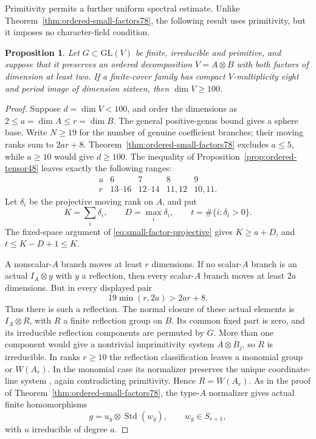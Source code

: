 \documentclass[11pt]{article}
\newtheorem{proposition}[theorem]{Proposition}
\theoremstyle{definition}
\theoremstyle{remark}
\begin{document}
Primitivity permits a further uniform spectral estimate. Unlike
Theorem~\ref{thm:ordered-small-factors78}, the following result
uses primitivity, but it imposes no character-field condition.

\begin{proposition}\label{prop:primitive-ordered100}
Let $G\subset\mathrm{GL}(V)$ be finite, irreducible and primitive,
and suppose that it preserves an ordered decomposition
$V=A\otimes B$ with both factors of dimension at least two.
If a finite-cover family has compact $V$-multiplicity eight
and period image of dimension sixteen, then $\dim V\geq100$.
\end{proposition}

\begin{proof}
Suppose $d=\dim V<100$, and order the dimensions as
$2\leq a=\dim A\leq r=\dim B$. The general positive-genus
bound gives a sphere base. Write $N\geq19$ for the number
of genuine coefficient branches; their moving ranks sum to
$2ar+8$. Theorem~\ref{thm:ordered-small-factors78} excludes
$a\leq5$, while $a\geq10$ would give $d\geq100$.
The inequality of Proposition~\ref{prop:ordered-tensor48}
leaves exactly the following ranges:
\[
\begin{array}{c|cccc}
 a&6&7&8&9\\ \hline
 r&13\text{--}16&12\text{--}14&11,12&10,11.
\end{array}
\]
Let $\delta_i$ be the projective moving rank on $A$, and put
\[
 K=\sum_i\delta_i,\qquad D=\max_i\delta_i,
 \qquad t=\#\{i:\delta_i>0\}.
\]
The fixed-space argument of \eqref{eq:small-factor-projective}
gives $K\geq a+D$, and $t\leq K-D+1\leq K$.

A nonscalar-$A$ branch moves at least $r$ dimensions.
If no scalar-$A$ branch is an actual $I_A\otimes y$ with
$y$ a reflection, then every scalar-$A$ branch moves at least
$2a$ dimensions. But in every displayed pair
\[
                 19\min(r,2a)>2ar+8.
\]
Thus there is such a reflection. The normal closure of these
actual elements is $I_A\otimes R$, with $R$ a finite
reflection group on $B$. Its common fixed part is zero,
and its irreducible reflection components are permuted by $G$.
More than one component would give a nontrivial imprimitivity
system $A\otimes B_j$, so $R$ is irreducible.
In ranks $r\geq10$ the reflection classification leaves a
monomial group or $W(A_r)$. In the monomial case its normalizer
preserves the unique coordinate-line system
\cite[Lemma~(2.7), in ranks at least five]{CohenReflection},
again contradicting primitivity. Hence $R=W(A_r)$.
As in the proof of Theorem~\ref{thm:ordered-small-factors78},
the type-$A$ normalizer gives actual finite homomorphisms
\[
                    g=u_g\otimes\operatorname{Std}(w_g),
                    \qquad w_g\in S_{r+1},
\]
with $u$ irreducible of degree $a$.


\end{proof}
\end{document}
